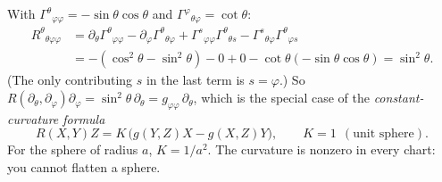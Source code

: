 \begin{example}
With $\Gamma^\theta{}_{\varphi\varphi}=-\sin\theta\cos\theta$ and $\Gamma^\varphi{}_{\theta\varphi}=\cot\theta$:
\[
\begin{aligned}R^\theta{}_{\theta\varphi\varphi}&=\partial_\theta\Gamma^\theta{}_{\varphi\varphi}-\partial_\varphi\Gamma^\theta{}_{\theta\varphi}+\Gamma^s{}_{\varphi\varphi}\Gamma^\theta{}_{\theta s}-\Gamma^s{}_{\theta\varphi}\Gamma^\theta{}_{\varphi s}\\
&=-(\cos^2\theta-\sin^2\theta)-0+0-\cot\theta(-\sin\theta\cos\theta)=\sin^2\theta .\end{aligned}
\]
(The only contributing $s$ in the last term is $s=\varphi$.) So $R(\partial_\theta,\partial_\varphi)\partial_\varphi=\sin^2\theta\,\partial_\theta=g_{\varphi\varphi}\,\partial_\theta$, which is the special case of the \emph{constant-curvature formula}
\[
R(X,Y)Z=K\,\big(g(Y,Z)X-g(X,Z)Y\big),\qquad K=1\ \ (\text{unit sphere}).
\]
For the sphere of radius $a$, $K=1/a^2$. The curvature is nonzero in every chart: you cannot flatten a sphere.
\end{example}
